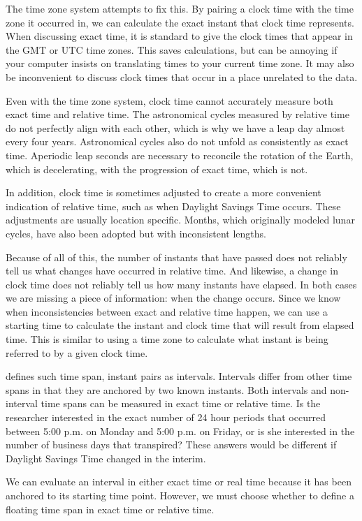 \documentclass[article]{jss}
\begin{document}
The time zone system attempts to fix this.  By pairing a clock time with the time zone it occurred in, we can calculate the exact instant that clock time represents. When discussing exact time, it is standard to give the clock times that appear in the GMT or UTC time zones.  This saves calculations, but can be annoying if your computer insists on translating times to your current time zone.  It may also be inconvenient to discuss clock times that occur in a place unrelated to the data.

Even with the time zone system, clock time cannot accurately measure both exact time and relative time. The astronomical cycles measured by relative time do not perfectly align with each other, which is why we have a leap day almost every four years. Astronomical cycles also do not unfold as consistently as exact time. Aperiodic leap seconds are necessary to reconcile the rotation of the Earth, which is decelerating, with the progression of exact time, which is not.

In addition, clock time is sometimes adjusted to create a more convenient indication of relative time, such as when Daylight Savings Time occurs.  These adjustments are usually location specific. Months, which originally modeled lunar cycles, have also been adopted but with inconsistent lengths.

Because of all of this, the number of instants that have passed does not reliably tell us what changes have occurred in relative time. And likewise, a change in clock time does not reliably tell us how many instants have elapsed. In both cases we are missing a piece of information: when the change occurs. Since we know when inconsistencies between exact and relative time happen, we can use a starting time to calculate the instant and clock time that will result from elapsed time. This is similar to using a time zone to calculate what instant is being referred to by a given clock time.

 defines such time span, instant pairs as intervals. Intervals differ from other time spans in that they are anchored by two known instants. Both intervals and non-interval time spans can be measured in exact time or relative time. Is the researcher interested in the exact number of 24 hour periods that occurred between 5:00 p.m. on Monday and 5:00 p.m. on Friday, or is she interested in the number of business days that transpired? These answers would be different if Daylight Savings Time changed in the interim.

We can evaluate an interval in either exact time or real time because it has been anchored to its starting time point. However, we must choose whether to define a floating time span in exact time or relative time.
\end{document}
